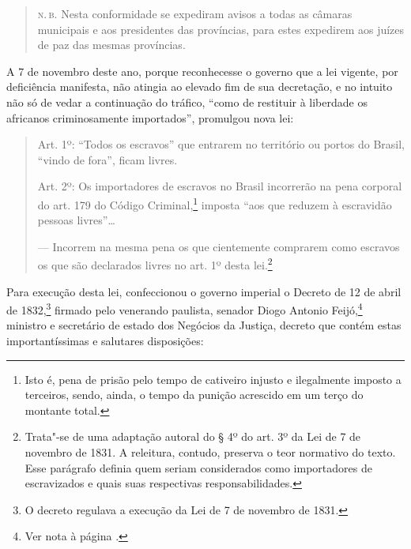 \begin{quote}
\textsc{n.\,b.} Nesta conformidade se expediram avisos a todas as câmaras
municipais e aos presidentes das províncias, para estes expedirem aos
juízes de paz das mesmas províncias.
\end{quote}

A 7 de novembro deste ano, porque reconhecesse o governo que a lei
vigente, por deficiência manifesta, não atingia ao elevado fim de sua
decretação, e no intuito não só de vedar a continuação do tráfico, ``como
de restituir à liberdade os africanos criminosamente importados'',
promulgou nova lei:

\begin{quote}
\forceindent{}Art. 1º: ``Todos os escravos'' que entrarem no território ou portos do
Brasil, ``vindo de fora'', ficam livres.

Art. 2º: Os importadores de escravos no Brasil incorrerão na pena
corporal do art. 179 do Código Criminal,\footnote{Isto é, pena de
  prisão pelo tempo de cativeiro injusto e ilegalmente imposto a
  terceiros, sendo, ainda, o tempo da punição acrescido em um terço do
  montante total.} imposta ``aos que reduzem à escravidão pessoas
livres''\ldots{}

--- Incorrem na mesma pena os que cientemente comprarem como escravos os
que são declarados livres no art. 1º desta lei.\footnote{Trata"-se de
  uma adaptação autoral do § 4º do art. 3º da Lei de 7 de novembro de
  1831. A releitura, contudo, preserva o teor normativo do texto. Esse
  parágrafo definia quem seriam considerados como
  importadores de escravizados e quais suas respectivas
  responsabilidades.}
\end{quote}

Para execução desta lei, confeccionou o governo imperial o Decreto de 12
de abril de 1832,\footnote{O decreto regulava a execução da Lei de 7 de
  novembro de 1831.} firmado pelo venerando paulista, senador Diogo
Antonio Feijó,\footnote{Ver nota à página \pageref{feijo}.} ministro e secretário de
estado dos Negócios da Justiça, decreto que contém estas
importantíssimas e salutares disposições:

